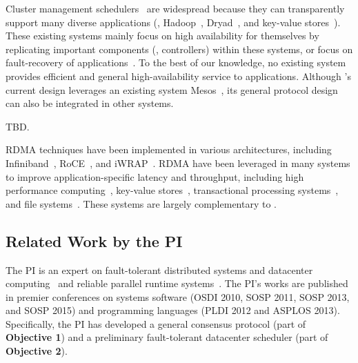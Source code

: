  Cluster management 
schedulers~\cite{borg:eurosys15,mesos:nsdi11,tupperware,yarn:socc13,
autopilot:sosp07,quincy:sosp09,apollo:osdi14,fuxi:vldb14} are widespread 
because they can transparently support many diverse applications (\eg, 
Hadoop~\cite{hadoop}, Dryad~\cite{dryad}, and key-value stores~\cite{redis}). 
These existing systems mainly focus on high availability for themselves by 
replicating important components (\eg, controllers) within these systems, or 
focus on fault-recovery of applications~\cite{fuxi:vldb14}. To the best of our 
knowledge, no existing system provides efficient and general high-availability 
service to applications. Although \xxx's current design leverages an existing 
system Mesos~\cite{mesos:nsdi11}, its general \paxos protocol design can also 
be integrated in other systems.

 TBD.

 RDMA techniques have been implemented in various 
architectures, including Infiniband~\cite{infiniband}, RoCE~\cite{roce}, and 
iWRAP~\cite{iwrap}. RDMA have been leveraged in many systems to improve 
application-specific latency and throughput, including high performance 
computing~\cite{openmpi}, key-value 
stores~\cite{pilaf:usenix14,herd:sigcomm14,farm:nsdi14,memcached:rdma}, 
transactional processing systems~\cite{drtm:sosp15,farm:sosp15}, and file 
systems~\cite{gibson:nfs}. These systems are largely complementary to \xxx.

\vspace{-.15in}\subsection{Related Work by the PI} 
\label{sec:my-work}\vspace{-.075in}
% 

The PI is an expert on fault-tolerant distributed systems and datacenter 
computing~\cite{crane:sosp15, tripod:apsys16} and reliable parallel 
runtime systems~\cite{smt:cacm, cui:tern:osdi10, peregrine:sosp11, 
parrot:sosp13}. The PI's works are published in premier conferences on systems 
software (OSDI 2010, SOSP 2011, SOSP 2013, and SOSP 2015) and programming 
languages (PLDI 2012 and ASPLOS 2013). Specifically, the PI has developed a 
general consensus protocol (part of \textbf{Objective 1}) and a preliminary 
fault-tolerant datacenter scheduler (part of \textbf{Objective 2}).





